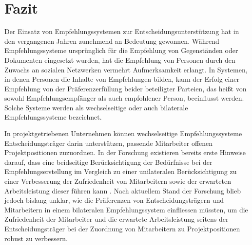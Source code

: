 
\chapter{Fazit}
\label{ch:fazit}
Der Einsatz von Empfehlungssystemen zur Entscheidungsunterstützung hat in den vergangenen Jahren zunehmend an Bedeutung gewonnen.
Während Empfehlungssysteme ursprünglich für die Empfehlung von Gegenständen oder Dokumenten eingesetzt wurden, hat die Empfehlung von Personen durch den Zuwachs an sozialen Netzwerken vermehrt Aufmerksamkeit erlangt.
In Systemen, in denen Personen die Inhalte von Empfehlungen bilden, kann der Erfolg einer Empfehlung von der Präferenzerfüllung beider beteiligter Parteien, das heißt von sowohl Empfehlungsempfänger als auch empfohlener Person, beeinflusst werden.
Solche Systeme werden als wechselseitige oder auch bilaterale Empfehlungssysteme bezeichnet.

In projektgetriebenen Unternehmen können wechselseitige Empfehlungssysteme Entscheidungsträger darin unterstützen, passende Mitarbeiter offenen Projektpositionen zuzuordnen.
In der Forschung existieren bereits erste Hinweise darauf, dass eine beidseitige Berücksichtigung der Bedürfnisse bei der Empfehlungserstellung im Vergleich zu einer unilateralen Berücksichtigung zu einer Verbesserung der Zufriedenheit von Mitarbeitern sowie der erwarteten Arbeitsleistung dieser führen kann \cite[S. 3]{link:booklet}.
Nach aktuellem Stand der Forschung blieb jedoch bislang unklar, wie die Präferenzen von Entscheidungsträgern und Mitarbeitern in einem bilateralen Empfehlungssystem einfliessen müssten, um die Zufriedenheit der Mitarbeiter und die erwartete Arbeitsleistung seitens der Entscheidungsträger bei der Zuordnung von Mitarbeitern zu Projektpositionen robust zu verbessern.

